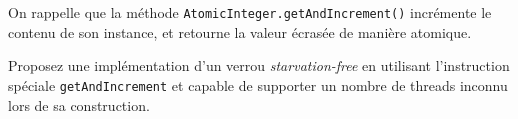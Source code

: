 
\begingroup

\begin{exercice}
  \label{exo:locks/getAndIncrement}

  On rappelle que la méthode \lstinline{AtomicInteger.getAndIncrement()} incrémente le contenu de son instance, et retourne la valeur écrasée de manière atomique. 

  \begin{question}
  \item Proposez une implémentation d'un verrou \emph{starvation-free} en utilisant l'instruction spéciale \lstinline{getAndIncrement}
    et capable de supporter un nombre de threads inconnu lors de sa construction.
  \end{question}

\end{exercice}

\endgroup
\endinput

